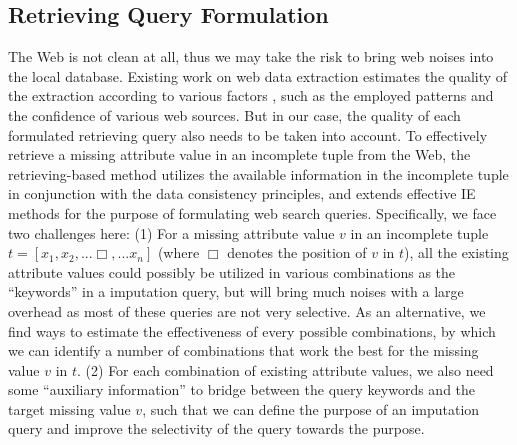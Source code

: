 \documentclass[sigconf]{acmart}
\begin{document}
\subsection{Retrieving Query Formulation}

{\color{red} The Web is not clean at all, thus we may take the risk to bring web noises into the local database. Existing work on web data extraction estimates the quality of the extraction according to various factors , such as the employed patterns and the confidence of various web sources. But in our case, the quality of each formulated retrieving query also needs to be taken into account. }To effectively retrieve a missing attribute value in an incomplete tuple from the Web, the retrieving-based method utilizes the available information in the incomplete tuple in conjunction with the data consistency principles, and extends effective IE methods for the purpose of formulating web search queries. Specifically, we face two challenges here: (1) For a missing attribute value $v$ in an incomplete tuple $t=[x_1,x_2 , ... \Box, ... x_n]$ (where $\Box$ denotes the position of $v$ in $t$), all the existing attribute values could possibly be utilized in various combinations as the ``keywords'' in a imputation query, but will bring much noises with a large overhead as most of these queries are not very selective. As an alternative, we find ways to estimate the effectiveness of every possible combinations, by which we can identify a number of combinations that work the best for the missing value $v$ in $t$.
%
(2) For each combination of existing attribute values, we also need some ``auxiliary information'' to bridge between the query keywords and the target missing value $v$, such that we can define the purpose of an imputation query and improve the selectivity of the query towards the purpose.
\end{document}
